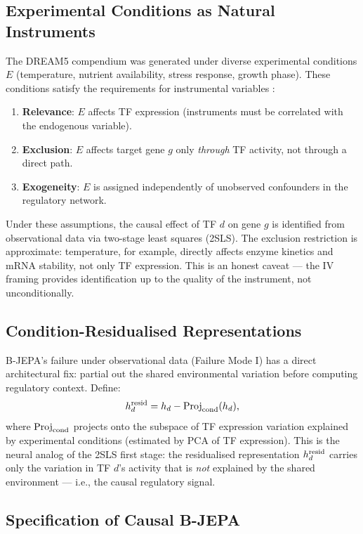 \documentclass[11pt]{article}
\begin{document}
\subsection{Experimental Conditions as Natural Instruments}

The DREAM5 compendium was generated under diverse experimental conditions
$E$ (temperature, nutrient availability, stress response, growth phase).
These conditions satisfy the requirements for instrumental variables \citep{angrist2009}:
\begin{enumerate}
  \item \textbf{Relevance}: $E$ affects TF expression (instruments must be
    correlated with the endogenous variable).
  \item \textbf{Exclusion}: $E$ affects target gene $g$ only \emph{through}
    TF activity, not through a direct path.
  \item \textbf{Exogeneity}: $E$ is assigned independently of unobserved
    confounders in the regulatory network.
\end{enumerate}
Under these assumptions, the causal effect of TF $d$ on gene $g$ is identified
from observational data via two-stage least squares (2SLS).
The exclusion restriction is approximate: temperature, for example, directly
affects enzyme kinetics and mRNA stability, not only TF expression.
This is an honest caveat --- the IV framing provides identification up to the
quality of the instrument, not unconditionally.

\subsection{Condition-Residualised Representations}

B-JEPA's failure under observational data (Failure Mode I) has a direct
architectural fix: partial out the shared environmental variation before
computing regulatory context.
Define:
\begin{equation}
  h_{d}^{\rm resid} = h_d - \mathrm{Proj}_{\rm cond}(h_d),
\end{equation}
where $\mathrm{Proj}_{\rm cond}$ projects onto the subspace of TF expression
variation explained by experimental conditions (estimated by PCA of TF
expression).
This is the neural analog of the 2SLS first stage: the residualised
representation $h_d^{\rm resid}$ carries only the variation in TF $d$'s
activity that is \emph{not} explained by the shared environment --- i.e., the
causal regulatory signal.

\subsection{Specification of Causal B-JEPA}
\end{document}
